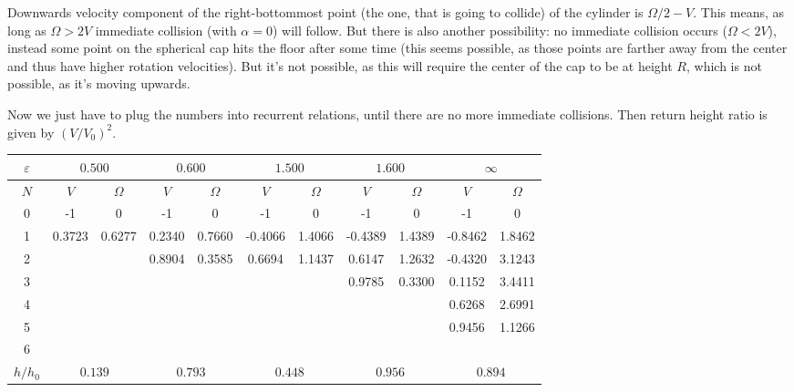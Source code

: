 Downwards velocity component of the right-bottommost point
(the one, that is going to collide) of the cylinder is $\Omega/2 - V$.
This means, as long as $\Omega > 2V$ immediate collision (with $\alpha=0$) will follow.
But there is also another possibility: no immediate collision occurs
($\Omega < 2V$),
instead some point on the spherical cap hits the floor after some time
(this seems possible, as those points are farther away from the center
and thus have higher rotation velocities).
But it's not possible, as this will require the center of the cap
to be at height $R$, which is not possible, as it's moving upwards.

Now we just have to plug the numbers into recurrent relations,
until there are no more immediate collisions.
Then return height ratio is given by $(V/V_0)^2$.
\begin{center}
\begin{tabular}{c|cc|cc|cc|cc|cc}
    $\varepsilon$ &
    \multicolumn{2}{c|}{$0.500$} &
    \multicolumn{2}{c|}{$0.600$} &
    \multicolumn{2}{c|}{$1.500$} &
    \multicolumn{2}{c|}{$1.600$} &
    \multicolumn{2}{c}{$\infty$}\\
    \hline
    $N$ & $V$ & $\Omega$ & $V$ & $\Omega$ & $V$ & $\Omega$ & $V$ & $\Omega$ & $V$ & $\Omega$ \\
    \hline
    0 & -1     & 0      & -1     & 0      & -1      & 0      & -1      & 0      & -1      & 0    \\
    1 & 0.3723 & 0.6277 & 0.2340 & 0.7660 & -0.4066 & 1.4066 & -0.4389 & 1.4389 & -0.8462 & 1.8462 \\
    2 &        &        & 0.8904 & 0.3585 & 0.6694  & 1.1437 & 0.6147  & 1.2632 & -0.4320 & 3.1243 \\
    3 &        &        &        &        &         &        & 0.9785  & 0.3300 &  0.1152 & 3.4411 \\
    4 &        &        &        &        &         &        &         &        &  0.6268 & 2.6991 \\
    5 &        &        &        &        &         &        &         &        &  0.9456 & 1.1266 \\
    6 &        &        &        &        &         &        &         &        &         &        \\
    \hline
    $h/h_0$ &
    \multicolumn{2}{c|}{$0.139$} &
    \multicolumn{2}{c|}{$0.793$} &
    \multicolumn{2}{c|}{$0.448$} &
    \multicolumn{2}{c|}{$0.956$} &
    \multicolumn{2}{c}{$0.894$}\\
    \hline
\end{tabular}
\end{center}

